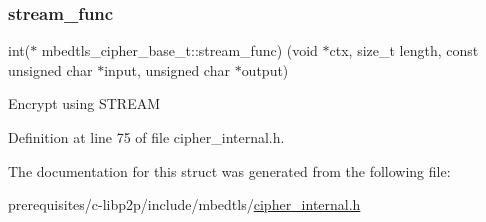 \subsubsection{\texorpdfstring{stream\+\_\+func}{stream\_func}}
{\footnotesize\ttfamily int($\ast$ mbedtls\+\_\+cipher\+\_\+base\+\_\+t\+::stream\+\_\+func) (void $\ast$ctx, size\+\_\+t length, const unsigned char $\ast$input, unsigned char $\ast$output)}

Encrypt using S\+T\+R\+E\+AM 

Definition at line 75 of file cipher\+\_\+internal.\+h.



The documentation for this struct was generated from the following file\+:\begin{DoxyCompactItemize}
\item 
prerequisites/c-\/libp2p/include/mbedtls/\mbox{\hyperlink{cipher__internal_8h}{cipher\+\_\+internal.\+h}}\end{DoxyCompactItemize}
